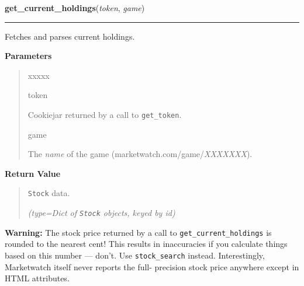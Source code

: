 \hspace{.8\funcindent}\begin{boxedminipage}{\funcwidth}

    \raggedright \textbf{get\_current\_holdings}(\textit{token}, \textit{game})

    \vspace{-1.5ex}

    \rule{\textwidth}{0.5\fboxrule}
\setlength{\parskip}{2ex}
    Fetches and parses current holdings.

\setlength{\parskip}{1ex}
      \textbf{Parameters}
      \vspace{-1ex}

      \begin{quote}
        \begin{Ventry}{xxxxx}

          \item[token]

          Cookiejar returned by a call to \texttt{get\_token}.

          \item[game]

          The \textit{name} of the game 
          (marketwatch.com/game/\textit{XXXXXXX}).

        \end{Ventry}

      \end{quote}

      \textbf{Return Value}
    \vspace{-1ex}

      \begin{quote}
      \texttt{Stock} data.

      {\it (type=Dict of \texttt{Stock} objects, keyed by \textit{id})}

      \end{quote}

\textbf{Warning:} The stock price returned by a call to \texttt{get\_current\_holdings} is 
rounded to the nearest cent! This results in inaccuracies if you calculate 
things based on this number --- don't. Use \texttt{stock\_search} instead. 
Interestingly, Marketwatch itself never reports the full- precision stock 
price anywhere except in HTML attributes.



    \end{boxedminipage}

    \label{moira:get_portfolio_data}

